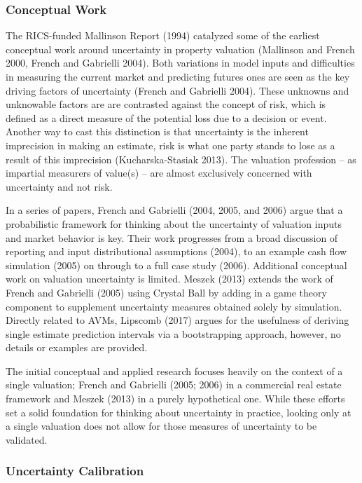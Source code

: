 \documentclass[colTwo]{anon}
\theoremstyle{definition}
\begin{document}
\subsubsection{Conceptual Work}

The RICS-funded Mallinson Report (1994) catalyzed some of the earliest conceptual work around uncertainty in property valuation (Mallinson and French 2000, French and Gabrielli 2004). Both variations in model inputs and difficulties in measuring the current market and predicting futures ones are seen as the key driving factors of uncertainty (French and Gabrielli 2004). These unknowns and unknowable factors are are contrasted against the concept of risk, which is defined as a direct measure of the potential loss due to a decision or event.  Another way to cast this distinction is that uncertainty is the inherent imprecision in making an estimate, risk is what one party stands to lose as a result of this imprecision (Kucharska-Stasiak 2013).  The valuation profession -- as impartial measurers of value(s) -- are almost exclusively concerned with uncertainty and not risk.

In a series of papers, French and Gabrielli (2004, 2005, and 2006) argue that a probabilistic framework for thinking about the uncertainty of valuation inputs and market behavior is key. Their work progresses from a broad discussion of reporting and input distributional assumptions (2004), to an example cash flow simulation (2005) on through to a full case study (2006). Additional conceptual work on valuation uncertainty is limited.  Meszek (2013) extends the work of French and Gabrielli (2005) using Crystal Ball by adding in a game theory component to supplement uncertainty measures obtained solely by simulation.  Directly related to AVMs, Lipscomb (2017) argues for the usefulness of deriving single estimate prediction intervals via a bootstrapping approach, however, no details or examples are provided. 

The initial conceptual and applied research focuses heavily on the context of a single valuation; French and Gabrielli (2005; 2006) in a commercial real estate framework and Meszek (2013) in a purely hypothetical one. While these efforts set a solid foundation for thinking about uncertainty in practice, looking only at a single valuation does not allow for those measures of uncertainty to be validated. 

\subsubsection{Uncertainty Calibration}
\end{document}
